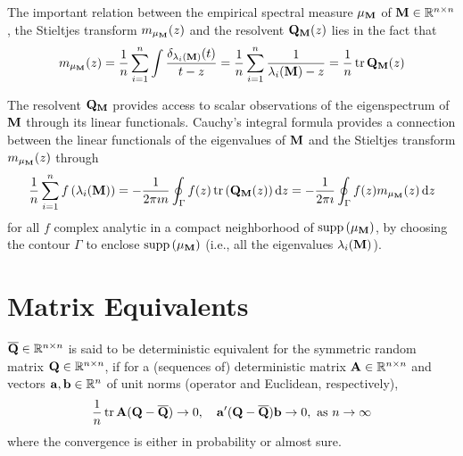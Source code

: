 \begin{remark}
	The important relation between the empirical spectral measure $\mu_{{\bf M}}$ of ${\bf M}\in{\mathbb R}^{n\times n}$, the Stieltjes transform $m_{\mu_{{\bf M}}}(z)$ and the resolvent ${\bf Q}_{{\bf M}}(z)$ lies in the fact that
	\begin{equation} \label{eq:relation-between-empirical-spectral-measures-stieltjes-transform-and-its-resolvent}
		m_{\mu_{{\bf M}}}(z)=\frac{1}{n}\sum_{i=1}^{n}\int\frac{\delta_{\lambda_{i}({\bf M})}(t)}{t-z}=\frac{1}{n}\sum_{i=1}^{n}\frac{1}{\lambda_{i}({\bf M})-z}=\frac{1}{n}\operatorname{tr}{\bf Q}_{{\bf M}}(z)
	\end{equation}
\end{remark}

The resolvent ${\bf Q}_{{\bf M}}$ provides access to scalar observations of the eigenspectrum of ${\bf M}$ through its linear functionals. Cauchy's integral formula provides a connection between the linear functionals of the eigenvalues of ${\bf M}$ and the Stieltjes transform $m_{\mu_{{\bf M}}}(z)$ through
\begin{equation}
	\frac{1}{n}\sum_{i=1}^{n}f\left(\lambda_{i}({\bf M})\right)=-\frac{1}{2\pi\imath n}\oint_{\Gamma}f(z)\operatorname{tr}\left({\bf Q}_{{\bf M}}(z)\right)\mathop{}\!\mathrm{d} z=-\frac{1}{2\pi\imath }\oint_{\Gamma}f(z)m_{\mu_{{\bf M}}}(z)\mathop{}\!\mathrm{d} z
\end{equation}
for all $f$ complex analytic in a compact neighborhood of $\operatorname{supp}\left(\mu_{{\bf M}}\right)$, by choosing the contour $\Gamma$ to enclose $\operatorname{supp}\left(\mu_{{\bf M}}\right)$ (i.e., all the eigenvalues $\lambda_{i}({\bf M})$).

\section{Matrix Equivalents}

\begin{definition}
	$\overline{{\bf Q}}\in{\mathbb R}^{n\times n}$ is said to be deterministic equivalent for the symmetric random matrix ${\bf Q}\in{\mathbb R}^{n\times n}$, if for a (sequences of) deterministic matrix ${\bf A}\in{\mathbb R}^{n\times n}$ and vectors ${\bf a},{\bf b}\in{\mathbb R}^{n}$ of unit norms (operator and Euclidean, respectively),
	\begin{equation}
		\frac{1}{n}\operatorname{tr}\bfA(\bfQ-\overline{\bfQ})\rightarrow 0,\quad\bfa^{\prime}(\bfQ-\overline{\bfQ})\bfb\rightarrow 0,\ \text{as}\ n\rightarrow\infty
	\end{equation}
	where the convergence is either in probability or almost sure.
\end{definition}

